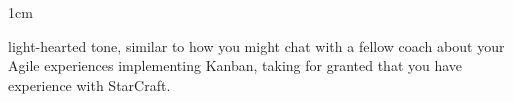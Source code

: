 \begin{setlength}{\leftmargin}{1cm}
\begin{description}
light-hearted tone, similar to how you might chat with a fellow coach about your Agile experiences implementing Kanban, taking for granted that you have experience with StarCraft.

\end{description}
\end{setlength}